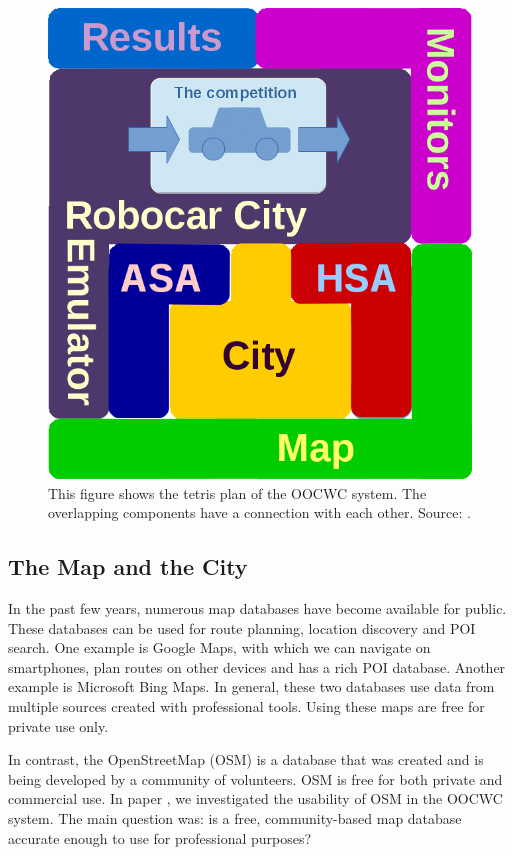 \documentclass[b5paper,12pt]{report}
\theoremstyle{definition}
\begin{document}
\begin{figure}[ht]
\centering
\includegraphics[scale=.3]{img/tetris_plan.png}
\caption{This figure shows the tetris plan of the OOCWC system. The overlapping components have a connection with each other. Source: \cite{infocomjournal}.}
\label{tetris_plan}
\end{figure}

\subsection{The Map and the City}
\label{map}

In the past few years, numerous map databases have become available for public. These databases can be used for route planning, location discovery and POI search. One example is Google Maps, with which we can navigate on smartphones, plan routes on other devices and has a rich POI database. Another example is Microsoft Bing Maps. In general, these two databases use data from multiple sources created with professional tools. Using these maps are free for private use only.

In contrast, the OpenStreetMap (OSM) is a database that was created and is being developed by a community of volunteers. OSM is free for both private and commercial use. In paper \cite{openmapsimul}, we investigated the usability of OSM in the OOCWC system. The main question was: is a free, community-based map database accurate enough to use for professional purposes?
\end{document}
